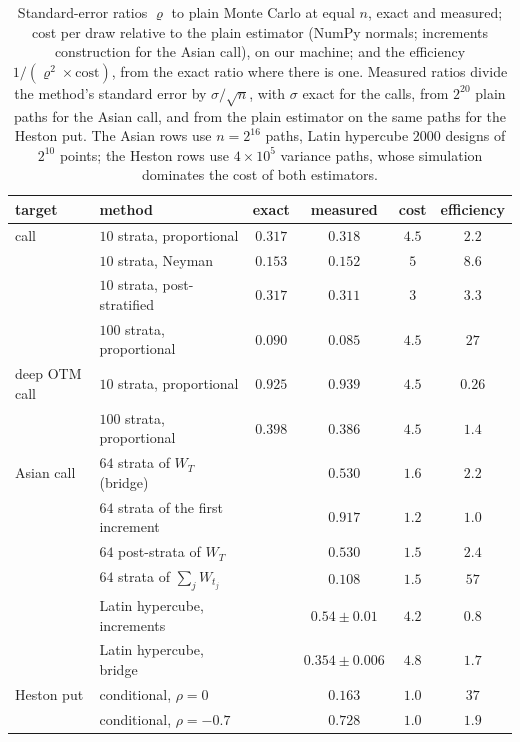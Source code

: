 \begin{table}[ht]
  \centering
  \small
  \begin{tabular}{@{}llcccc@{}}
    \toprule
    target & method & exact & measured & cost & efficiency\\
    \midrule
    call & $10$ strata, proportional & $0.317$ & $0.318$ & $4.5$ & $2.2$\\
     & $10$ strata, Neyman & $0.153$ & $0.152$ & $5$ & $8.6$\\
     & $10$ strata, post-stratified & $0.317$ & $0.311$ & $3$ & $3.3$\\
     & $100$ strata, proportional & $0.090$ & $0.085$ & $4.5$ & $27$\\
    \midrule
    deep OTM call & $10$ strata, proportional & $0.925$ & $0.939$ & $4.5$ & $0.26$\\
     & $100$ strata, proportional & $0.398$ & $0.386$ & $4.5$ & $1.4$\\
    \midrule
    Asian call & $64$ strata of $W_T$ (bridge) & & $0.530$ & $1.6$ & $2.2$\\
     & $64$ strata of the first increment & & $0.917$ & $1.2$ & $1.0$\\
     & $64$ post-strata of $W_T$ & & $0.530$ & $1.5$ & $2.4$\\
     & $64$ strata of $\sum_jW_{t_j}$ & & $0.108$ & $1.5$ & $57$\\
     & Latin hypercube, increments & & $0.54\pm0.01$ & $4.2$ & $0.8$\\
     & Latin hypercube, bridge & & $0.354\pm0.006$ & $4.8$ & $1.7$\\
    \midrule
    Heston put & conditional, $\rho=0$ & & $0.163$ & $1.0$ & $37$\\
     & conditional, $\rho=-0.7$ & & $0.728$ & $1.0$ & $1.9$\\
    \bottomrule
  \end{tabular}
  \caption{Standard-error ratios $\varrho$ to plain Monte Carlo at equal $n$, exact and measured;
    cost per draw relative to the plain estimator (NumPy normals; increments construction for the
    Asian call), on our machine; and the efficiency $1/(\varrho^2\times\text{cost})$, from the exact
    ratio where there is one. Measured ratios divide the method's standard error by
    $\sigma/\sqrt n$, with $\sigma$ exact for the calls, from $2^{20}$ plain paths for the Asian
    call, and from the plain estimator on the same paths for the Heston put. The Asian rows use
    $n=2^{16}$ paths, Latin hypercube $2000$ designs of $2^{10}$ points; the Heston rows use
    $4\times10^5$ variance paths, whose simulation dominates the cost of both estimators.}
  \label{tab:st-lab}
\end{table}

